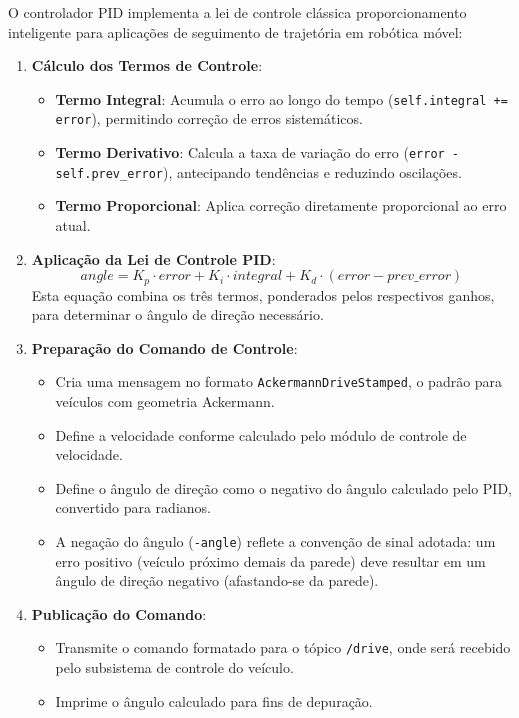 O controlador PID implementa a lei de controle clássica proporcionamento
inteligente para aplicações de seguimento de trajetória em robótica móvel:

\begin{enumerate}
    \item \textbf{Cálculo dos Termos de Controle}:
          \begin{itemize}
              \item \textbf{Termo Integral}: Acumula o erro ao longo do tempo (\texttt{self.integral += error}), permitindo correção de erros sistemáticos.
              \item \textbf{Termo Derivativo}: Calcula a taxa de variação do erro (\texttt{error - self.prev\_error}), antecipando tendências e reduzindo oscilações.
              \item \textbf{Termo Proporcional}: Aplica correção diretamente proporcional ao erro atual.
          \end{itemize}

    \item \textbf{Aplicação da Lei de Controle PID}:
          \begin{equation}
              angle = K_p \cdot error + K_i \cdot integral + K_d \cdot (error - prev\_error)
          \end{equation}
          Esta equação combina os três termos, ponderados pelos respectivos ganhos, para determinar o ângulo de direção necessário.

    \item \textbf{Preparação do Comando de Controle}:
          \begin{itemize}
              \item Cria uma mensagem no formato \texttt{AckermannDriveStamped}, o padrão para
                    veículos com geometria Ackermann.
              \item Define a velocidade conforme calculado pelo módulo de controle de velocidade.
              \item Define o ângulo de direção como o negativo do ângulo calculado pelo PID,
                    convertido para radianos.
              \item A negação do ângulo (\texttt{-angle}) reflete a convenção de sinal adotada: um
                    erro positivo (veículo próximo demais da parede) deve resultar em um ângulo de
                    direção negativo (afastando-se da parede).
          \end{itemize}

    \item \textbf{Publicação do Comando}:
          \begin{itemize}
              \item Transmite o comando formatado para o tópico \texttt{/drive}, onde será recebido
                    pelo subsistema de controle do veículo.
              \item Imprime o ângulo calculado para fins de depuração.
          \end{itemize}
\end{enumerate}

